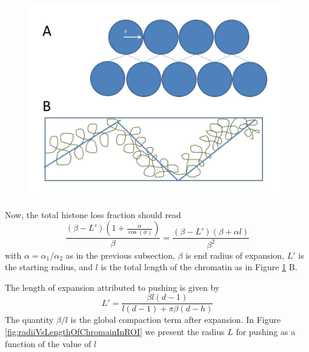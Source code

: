 \documentclass[12pt]{report}
\begin{document}
\begin{figure}[H]
\centering
\includegraphics[width=0.7\linewidth, height=0.3\textheight]{Images/SlidingModel/2Darrangement}
\caption{}
\label{fig:2Darrangement}
\end{figure}

Now, the total histone loss fraction should read 
\begin{equation*}
\frac{(\beta-L')(1+\frac{\alpha}{\cos(\phi)})}{\beta}=\frac{(\beta-L')(\beta+\alpha l)}{\beta^2}
\end{equation*}
with $\alpha = \alpha_1/\alpha_2$ as in the previous subsection, $\beta$ is end radius of expansion, $L'$ is the starting radius, and $l$ is the total length of the chromatin as in Figure \ref{fig:2Darrangement} B. 
 
The length of expansion attributed to pushing is given by 
   \begin{equation*}
   L' = \frac{\beta l(d-1)}{l(d-1) +\pi \beta(d-h)}
   \end{equation*}
 The quantity $\beta /l$ is the global compaction term after expansion. In Figure \ref{fig:radiiVsLengthOfChromainInROI} we present the radius $L$ for pushing as a function of the value of $l$ 
 
\end{document}
